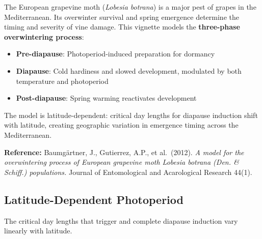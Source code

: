 The European grapevine moth (\emph{Lobesia botrana}) is a major pest of grapes in the Mediterranean. Its overwinter survival and spring emergence determine the timing and severity of vine damage. This vignette models the \textbf{three-phase overwintering process}:



\begin{itemize}
\item[1. ] \textbf{Pre-diapause}: Photoperiod-induced preparation for dormancy


\item[2. ] \textbf{Diapause}: Cold hardiness and slowed development, modulated by  both temperature and photoperiod


\item[3. ] \textbf{Post-diapause}: Spring warming reactivates development

\end{itemize}


The model is latitude-dependent: critical day lengths for diapause induction shift with latitude, creating geographic variation in emergence timing across the Mediterranean.



\textbf{Reference:} Baumgärtner, J., Gutierrez, A.P., et al.~(2012). \emph{A model for the overwintering process of European grapevine moth Lobesia botrana (Den. \& Schiff.) populations.} Journal of Entomological and Acarological Research 44(1).



\subsection{Latitude-Dependent Photoperiod}



\label{3000184745410369042}{}


The critical day lengths that trigger and complete diapause induction vary linearly with latitude.




